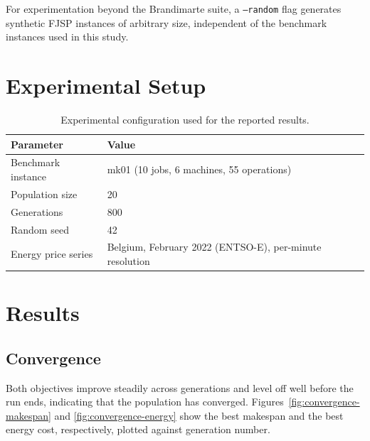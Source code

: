 \documentclass[11pt,a4paper]{article}
\begin{document}
For experimentation beyond the Brandimarte suite, a \texttt{--random} flag generates synthetic FJSP
instances of arbitrary size, independent of the benchmark instances used in this study.

\section{Experimental Setup}
\label{sec:experimental-setup}

\begin{table}[htbp]
    \centering
    \caption{Experimental configuration used for the reported results.}
    \label{tab:experimental-setup}
    \begin{tabular}{ll}
        \toprule
        \textbf{Parameter} & \textbf{Value} \\
        \midrule
        Benchmark instance & mk01 (10 jobs, 6 machines, 55 operations) \\
        Population size & 20 \\
        Generations & 800 \\
        Random seed & 42 \\
        Energy price series & Belgium, February 2022 (ENTSO-E), per-minute resolution \\
        \bottomrule
    \end{tabular}
\end{table}

\section{Results}
\label{sec:results}

\subsection{Convergence}
\label{subsec:convergence}

Both objectives improve steadily across generations and level off well before the run ends,
indicating that the population has converged. Figures~\ref{fig:convergence-makespan} and
\ref{fig:convergence-energy} show the best makespan and the best energy cost, respectively, plotted
against generation number.
\end{document}
